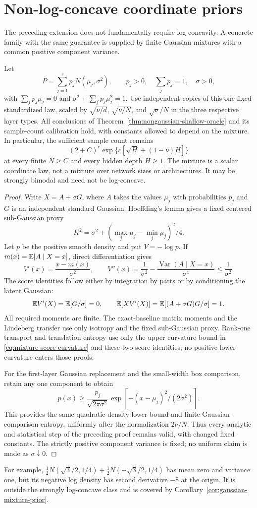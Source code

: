 \section{Non-log-concave coordinate priors}
\label{sec:gaussian-mixture-priors}
The preceding extension does not fundamentally require log-concavity.
A concrete family with the same guarantee is supplied by finite
Gaussian mixtures with a common positive component variance.

\begin{corollary}
\label{cor:gaussian-mixture-prior}
Let
\[
 P=\sum_{j=1}^r p_jN(\mu_j,\sigma^2),
 \qquad p_j>0,\quad\sum_jp_j=1,\quad\sigma>0,
\]
with $\sum_jp_j\mu_j=0$ and
$\sigma^2+\sum_jp_j\mu_j^2=1$.
Use independent copies of this one fixed standardized law, scaled by
$\sqrt{\nu/d}$, $\sqrt{\nu/N}$, and $\sqrt\nu/N$ in the three
respective layer types. All conclusions of
Theorem~\ref{thm:nongaussian-shallow-oracle} and its sample-count
calibration hold, with constants allowed to depend on the mixture.
In particular, the sufficient sample count remains
\[
 (2+C)^c\exp\{c[\sqrt H+(1-\nu)H]\}
\]
at every finite $N\ge C$ and every hidden depth $H\ge1$.
The mixture is a scalar coordinate law, not a mixture over network
sizes or architectures. It may be strongly bimodal and need not be
log-concave.
\end{corollary}
\begin{proof}
Write $X=A+\sigma G$, where $A$ takes the values $\mu_j$ with
probabilities $p_j$ and $G$ is an independent standard Gaussian.
Hoeffding's lemma gives a fixed centered sub-Gaussian proxy
\[
 K^2=\sigma^2+(\max_j\mu_j-\min_j\mu_j)^2/4.
\]
Let $p$ be the positive smooth density and put $V=-\log p$.
If $m(x)=\mathbb E[A\mid X=x]$, direct differentiation gives
\begin{equation}
 V'(x)=\frac{x-m(x)}{\sigma^2},
 \qquad
 V''(x)=\frac1{\sigma^2}
              -\frac{\operatorname{Var}(A\mid X=x)}{\sigma^4}
 \le\frac1{\sigma^2}.
 \label{eq:mixture-score-curvature}
\end{equation}
The score identities follow either by integration by parts or by
conditioning the latent Gaussian:
\[
 \mathbb E V'(X)=\mathbb E[G/\sigma]=0,\qquad
 \mathbb E[XV'(X)]=\mathbb E[(A+\sigma G)G/\sigma]=1.
\]
All required moments are finite. The exact-baseline matrix moments
and the Lindeberg transfer use only isotropy and the fixed
sub-Gaussian proxy. Rank-one transport and translation entropy use
only the upper curvature bound in
\eqref{eq:mixture-score-curvature} and these two score identities;
no positive lower curvature enters those proofs.

For the first-layer Gaussian replacement and the small-width box
comparison, retain any one component to obtain
\[
 p(x)\ge\frac{p_j}{\sqrt{2\pi\sigma^2}}
            \exp[-(x-\mu_j)^2/(2\sigma^2)].
\]
This provides the same quadratic density lower bound and finite
Gaussian-comparison entropy, uniformly after the normalization
$2\nu/N$. Thus every analytic and statistical step of the preceding
proof remains valid, with changed fixed constants. The strictly
positive component variance is fixed; no uniform claim is made as
$\sigma\downarrow0$.
\end{proof}

For example,
$\tfrac12N(\sqrt3/2,1/4)+\tfrac12N(-\sqrt3/2,1/4)$ has mean zero
and variance one, but its negative log density has second derivative
$-8$ at the origin. It is outside the strongly log-concave class and
is covered by Corollary~\ref{cor:gaussian-mixture-prior}.
